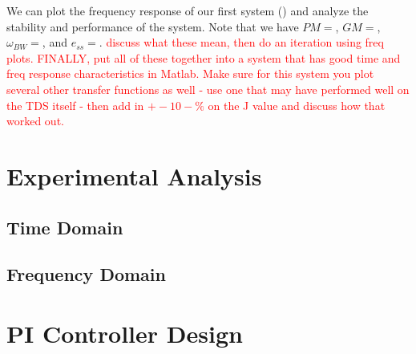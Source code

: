 \documentclass[11pt,titlepage]{article}
\begin{document}
	We can plot the frequency response of our first system () and analyze the stability and performance of the system. Note that we have 
	$PM=$, $GM=$, $\omega_{BW}=$, and $e_{ss}=$. \textcolor{red}{discuss what these mean, then do an iteration using freq plots. FINALLY, put all of these together into a system that has good time and freq response characteristics in Matlab. Make sure for this system you plot several other transfer functions as well - use one that may have performed well on the TDS itself - then add in $+-10-\%$ on the J value and discuss how that worked out.}
	 
\section{Experimental Analysis}
    \subsection{Time Domain}

    \subsection{Frequency Domain}

\section{PI Controller Design}
\end{document}
